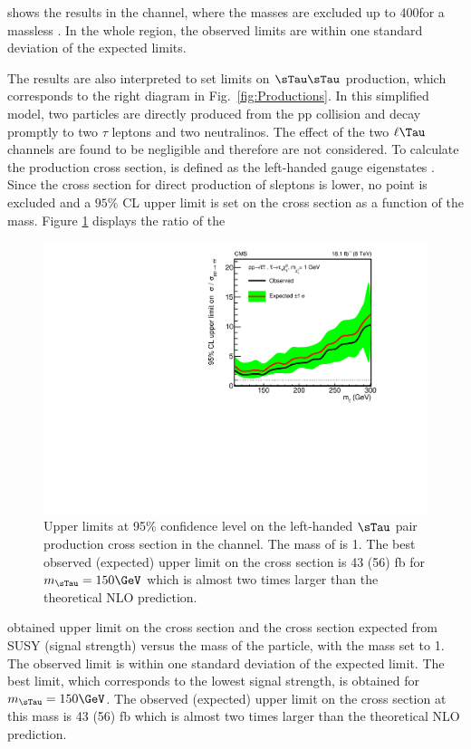 shows the results in the \tauTau channel, where the \chione masses are excluded up to 400\GeV for a massless \PSGczDo. 
In the whole region, the observed limits are within one standard deviation of the expected limits.  

The results are also interpreted to set limits on $\sTau\sTau$ production, 
which corresponds to the right diagram in Fig.~\ref{fig:Productions}. 
In this simplified model, two \sTau particles are directly produced from the pp  collision and decay promptly to two $\tau$ leptons and two neutralinos. 
The effect of the two $\ell\Tau$ channels are found to be negligible and therefore are not considered.
To calculate the production cross section, \sTau is defined as the left-handed \sTau gauge eigenstates \cite{Fuks:2013lya}. 
Since the cross section for direct production of sleptons is lower, no point is excluded and a $95\%$ CL upper limit is set on 
the cross section  as a function of the \sTau mass. 
Figure \ref{fig:limit_stau_stau} displays the ratio of the 
\begin{linenomath}
\begin{figure}[!htb]
\centering
\includegraphics[width=1.0\textwidth,keepaspectratio=true]{StatisticsFig/ExclusionSTauSTauLsp1.pdf}
\caption{Upper limits at 95\% confidence level on the left-handed $\sTau$ pair production cross section in the \tauTau channel. The mass of \PSGczDo is 1\GeV. 
The best observed (expected) upper limit on the cross section is 43 (56) fb for $m_{\sTau}=150\GeV$ 
which is almost two  times larger than the theoretical NLO prediction.}
\label{fig:limit_stau_stau}
\end{figure}
\end{linenomath}
obtained upper limit on the cross section and the cross section expected from SUSY (signal strength) versus the mass of the \sTau particle, 
with the \PSGczDo mass set to 1\GeV.
The observed limit is within one standard deviation of  the expected limit.
The best limit, which corresponds to the lowest signal strength, is obtained for $m_{\sTau}=150\GeV$. 
The observed (expected) upper limit on the cross section at this mass is 43 (56) fb which is almost two  times larger than the theoretical NLO prediction.



